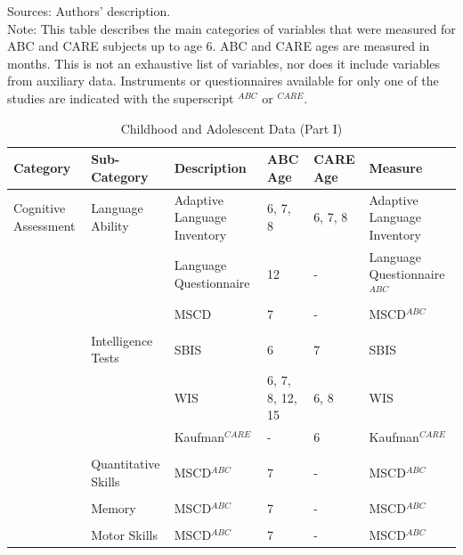 \documentclass[static]{JJH-Beamer}
\begin{document}
{\flushleft \normalsize Sources: Authors' description. \\	
Note: This table describes the main categories of variables that were measured for ABC and CARE subjects up to age 6. ABC and CARE ages are measured in months. This is not an exhaustive list of variables, nor does it include variables from auxiliary data.  Instruments or questionnaires available for only one of the studies are indicated with the superscript $^{ABC}$ or $^{CARE}$.\\}
\clearpage

\begin{frame}
 \addtocounter{framenumber}{-1}

\begin{table}[H]
\caption{Childhood and Adolescent Data (Part I)} \label{tab:youthvars_1}
\begin{center}
\begin{tiny}
\begin{tabular}{L{1.2cm} C{1.4cm} C{2.3cm} C{1cm} C{1cm} C{2.7cm}}
\toprule
\textbf{Category}	&	\textbf{Sub-Category}	&	\textbf{Description}	&	\textbf{ABC Age}  	&  \textbf{CARE Age}  & 	\textbf{Measure}	\\ \midrule
Cognitive Assessment	&	Language Ability	&	Adaptive Language Inventory	&	6, 7, 8	&	6, 7, 8	&	Adaptive Language Inventory	\\
	&		&	Language Questionnaire	&	12	&	- 	&	Language Questionnaire$^{ABC}$	\\
	&		&	MSCD 	&	7	&	- 	&	MSCD$^{ABC}$	\\
	&	\\
	&	Intelligence Tests	&	SBIS	 &	6	&	7	&	SBIS	\\
	&		&	 WIS	&	6, 7, 8, 12, 15	&	6, 8	&	WIS	\\
	&		& Kaufman$^{CARE}$ & 	-	& 6 & Kaufman$^{CARE}$ \\
	&	\\
	&	Quantitative Skills	&	MSCD$^{ABC}$ 	&	7	&	-	&	MSCD$^{ABC}$ 	\\
	&	\\
	&	Memory	&	MSCD$^{ABC}$ 	&	7	&	-	&	MSCD$^{ABC}$	\\
	&	\\
	&	Motor Skills	&	MSCD$^{ABC}$ 	&	7	&	-	&	MSCD$^{ABC}$	\\
\bottomrule
\end{tabular}
\end{tiny}
\end{center}
\end{table}

\end{frame}
\end{document}
